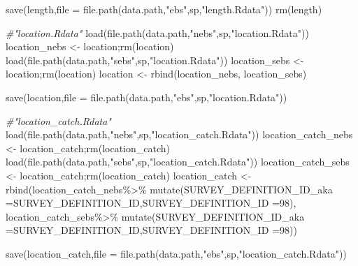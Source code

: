 \documentclass[
]{article}
\newenvironment{Shaded}{\begin{snugshade}}{\end{snugshade}}
\newcommand{\AttributeTok}[1]{\textcolor[rgb]{0.77,0.63,0.00}{#1}}
\newcommand{\CommentTok}[1]{\textcolor[rgb]{0.56,0.35,0.01}{\textit{#1}}}
\newcommand{\DecValTok}[1]{\textcolor[rgb]{0.00,0.00,0.81}{#1}}
\newcommand{\FunctionTok}[1]{\textcolor[rgb]{0.00,0.00,0.00}{#1}}
\newcommand{\NormalTok}[1]{#1}
\newcommand{\OtherTok}[1]{\textcolor[rgb]{0.56,0.35,0.01}{#1}}
\newcommand{\SpecialCharTok}[1]{\textcolor[rgb]{0.00,0.00,0.00}{#1}}
\newcommand{\StringTok}[1]{\textcolor[rgb]{0.31,0.60,0.02}{#1}}
\begin{document}
\begin{Shaded}
\begin{Highlighting}[]
    \FunctionTok{save}\NormalTok{(length,}\AttributeTok{file =} \FunctionTok{file.path}\NormalTok{(data.path,}\StringTok{"ebs"}\NormalTok{,sp,}\StringTok{"length.Rdata"}\NormalTok{))}
    \FunctionTok{rm}\NormalTok{(length)}
    
    \CommentTok{\#"location.Rdata"        }
    \FunctionTok{load}\NormalTok{(}\FunctionTok{file.path}\NormalTok{(data.path,}\StringTok{"nebs"}\NormalTok{,sp,}\StringTok{"location.Rdata"}\NormalTok{))}
\NormalTok{    location\_nebs }\OtherTok{\textless{}{-}}\NormalTok{ location;}\FunctionTok{rm}\NormalTok{(location)}
    \FunctionTok{load}\NormalTok{(}\FunctionTok{file.path}\NormalTok{(data.path,}\StringTok{"sebs"}\NormalTok{,sp,}\StringTok{"location.Rdata"}\NormalTok{))}
\NormalTok{    location\_sebs }\OtherTok{\textless{}{-}}\NormalTok{ location;}\FunctionTok{rm}\NormalTok{(location)}
\NormalTok{    location      }\OtherTok{\textless{}{-}} \FunctionTok{rbind}\NormalTok{(location\_nebs, location\_sebs)}
    
    \FunctionTok{save}\NormalTok{(location,}\AttributeTok{file =} \FunctionTok{file.path}\NormalTok{(data.path,}\StringTok{"ebs"}\NormalTok{,sp,}\StringTok{"location.Rdata"}\NormalTok{))}
    
    
    \CommentTok{\#"location\_catch.Rdata"}
    \FunctionTok{load}\NormalTok{(}\FunctionTok{file.path}\NormalTok{(data.path,}\StringTok{"nebs"}\NormalTok{,sp,}\StringTok{"location\_catch.Rdata"}\NormalTok{))}
\NormalTok{    location\_catch\_nebs }\OtherTok{\textless{}{-}}\NormalTok{ location\_catch;}\FunctionTok{rm}\NormalTok{(location\_catch)}
    \FunctionTok{load}\NormalTok{(}\FunctionTok{file.path}\NormalTok{(data.path,}\StringTok{"sebs"}\NormalTok{,sp,}\StringTok{"location\_catch.Rdata"}\NormalTok{))}
\NormalTok{    location\_catch\_sebs }\OtherTok{\textless{}{-}}\NormalTok{ location\_catch;}\FunctionTok{rm}\NormalTok{(location\_catch)}
\NormalTok{    location\_catch      }\OtherTok{\textless{}{-}} \FunctionTok{rbind}\NormalTok{(location\_catch\_nebs}\SpecialCharTok{\%\textgreater{}\%}
      \FunctionTok{mutate}\NormalTok{(}\AttributeTok{SURVEY\_DEFINITION\_ID\_aka =}\NormalTok{SURVEY\_DEFINITION\_ID,}\AttributeTok{SURVEY\_DEFINITION\_ID =}\DecValTok{98}\NormalTok{),}
\NormalTok{     location\_catch\_sebs}\SpecialCharTok{\%\textgreater{}\%}
      \FunctionTok{mutate}\NormalTok{(}\AttributeTok{SURVEY\_DEFINITION\_ID\_aka =}\NormalTok{SURVEY\_DEFINITION\_ID,}\AttributeTok{SURVEY\_DEFINITION\_ID =}\DecValTok{98}\NormalTok{))}
    
    \FunctionTok{save}\NormalTok{(location\_catch,}\AttributeTok{file =} \FunctionTok{file.path}\NormalTok{(data.path,}\StringTok{"ebs"}\NormalTok{,sp,}\StringTok{"location\_catch.Rdata"}\NormalTok{))}
    

\end{Highlighting}
\end{Shaded}
\end{document}
